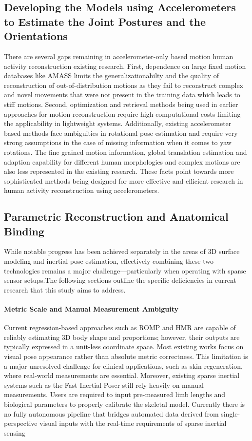 \documentclass[12pt, a4paper, oneside]{report}
\begin{document}
\subsection{Developing the Models using Accelerometers to Estimate the Joint Postures and the Orientations }
There are several gaps remaining in accelerometer-only based motion human activity reconstruction existing research. First, dependence on large fixed motion databases like AMASS limits the generalizationabilty and the quality of reconstruction of out-of-distribution motions as they fail to reconstruct complex and novel movements that were not present in the training data which leads to stiff motions. Second, optimization and retrieval methods being used in earlier approaches for motion reconstruction require high computational costs limiting the applicability in lightweight systems. Additionally, existing accelerometer based methods face ambiguities in rotational pose estimation and require very strong assumptions in the case of missing information when it comes to yaw rotations. The fine grained motion information, global translation estimation and adaption capability for different human morphologies and complex motions are also less represented in the existing research. These facts point towards more sophisticated methods being designed for more effective and efficient research in human activity reconstruction using accelerometers\cite{tautges2011motion}.


\subsection{Parametric Reconstruction and Anatomical Binding}
While notable progress has been achieved separately in the areas of 3D surface modeling and inertial pose estimation, effectively combining these two technologies remains a major challenge—particularly when operating with sparse sensor setups.The following sections outline the specific deficiencies in current research that this study aims to address.

\paragraph{Metric Scale and Manual Measurement Ambiguity}
Current regression-based approaches such as ROMP\cite{sun2021monocular} and HMR\cite{kanazawa2018hmr} are capable of reliably estimating 3D body shape and proportions; however, their outputs are typically expressed in a unit-less coordinate space. Most existing works focus on visual pose appearance rather than absolute metric correctness. This limitation is a major unresolved challenge for clinical applications, such as skin regeneration, where real-world measurements are essential.
Moreover, existing sparse inertial systems such as the Fast Inertial Poser\cite{xiao2024fast} still rely heavily on manual measurements. Users are required to input pre-measured limb lengths and biological parameters to properly calibrate the skeletal model. Currently there is no fully autonomous pipeline that bridges automated data derived from single-perspective visual inputs with the real-time requirements of sparse inertial sensing
\end{document}
